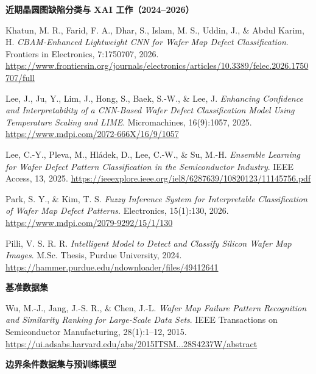 \documentclass[11pt,a4paper]{article}
\begin{document}
\textbf{近期晶圆图缺陷分类与 XAI 工作（2024–2026）}

\begin{list}{}{\setlength{\leftmargin}{2.5em}\setlength{\labelwidth}{2em}\setlength{\labelsep}{0.3em}\setlength{\itemsep}{0.2ex}}
\item[13.] Khatun, M. R., Farid, F. A., Dhar, S., Islam, M. S., Uddin, J., \& Abdul Karim, H. \emph{CBAM-Enhanced Lightweight CNN for Wafer Map Defect Classification}. Frontiers in Electronics, 7:1750707, 2026. \url{https://www.frontiersin.org/journals/electronics/articles/10.3389/felec.2026.1750707/full}
\item[14.] Lee, J., Ju, Y., Lim, J., Hong, S., Baek, S.-W., \& Lee, J. \emph{Enhancing Confidence and Interpretability of a CNN-Based Wafer Defect Classification Model Using Temperature Scaling and LIME}. Micromachines, 16(9):1057, 2025. \url{https://www.mdpi.com/2072-666X/16/9/1057}
\item[15.] Lee, C.-Y., Pleva, M., Hládek, D., Lee, C.-W., \& Su, M.-H. \emph{Ensemble Learning for Wafer Defect Pattern Classification in the Semiconductor Industry}. IEEE Access, 13, 2025. \url{https://ieeexplore.ieee.org/iel8/6287639/10820123/11145756.pdf}
\item[16.] Park, S. Y., \& Kim, T. S. \emph{Fuzzy Inference System for Interpretable Classification of Wafer Map Defect Patterns}. Electronics, 15(1):130, 2026. \url{https://www.mdpi.com/2079-9292/15/1/130}
\item[17.] Pilli, V. S. R. R. \emph{Intelligent Model to Detect and Classify Silicon Wafer Map Images}. M.Sc. Thesis, Purdue University, 2024. \url{https://hammer.purdue.edu/ndownloader/files/49412641}
\end{list}

\textbf{基准数据集}

\begin{list}{}{\setlength{\leftmargin}{2.5em}\setlength{\labelwidth}{2em}\setlength{\labelsep}{0.3em}\setlength{\itemsep}{0.2ex}}
\item[18.] Wu, M.-J., Jang, J.-S. R., \& Chen, J.-L. \emph{Wafer Map Failure Pattern Recognition and Similarity Ranking for Large-Scale Data Sets}. IEEE Transactions on Semiconductor Manufacturing, 28(1):1–12, 2015. \url{https://ui.adsabs.harvard.edu/abs/2015ITSM...28S4237W/abstract}
\end{list}

\textbf{边界条件数据集与预训练模型}
\end{document}

